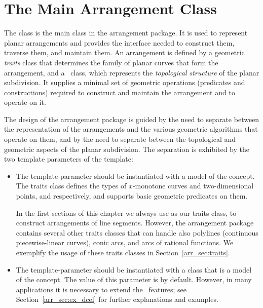 \section{The Main Arrangement Class\label{arr_sec:arr_class}}

The class  is the main class in
the arrangement package. It is used to represent planar
arrangements and provides the interface needed to construct them,
traverse them, and maintain them. An arrangement is defined by
a geometric {\em traits} class that determines the family of planar
curves that form the arrangement, and a \dcel\ class, which
represents the {\em topological structure} of the planar subdivision.
It supplies a minimal set of geometric operations (predicates and
constructions) required to construct and maintain the arrangement
and to operate on it.

The design of the arrangement package is guided by the need to
separate between the representation of the arrangements and the
various geometric algorithms that operate on them, and by the need to
separate between the topological and geometric aspects of the planar
subdivision. The separation is exhibited by the two template
parameters of the  template:
\begin{itemize}
\item The  template-parameter should be instantiated with
a model of the  concept. The traits
class defines the types of $x$-monotone curves and two-dimensional
points,  and  respectively, and
supports basic geometric predicates on them.

In the first sections of this chapter we always use
 as our traits class, to construct
arrangements of line segments. However, the arrangement package 
contains several other traits classes that can handle also
polylines (continuous piecewise-linear curves), conic arcs, and arcs
of rational functions. We exemplify the usage of these traits classes
in Section~\ref{arr_sec:traits}.
\item The  template-parameter should be instantiated with
a class that is a model of the  concept. The
value of this parameter is  by default.
However, in many applications it is necessary
to extend the \dcel\ features; see Section~\ref{arr_sec:ex_dcel} for
further explanations and examples.
\end{itemize}

